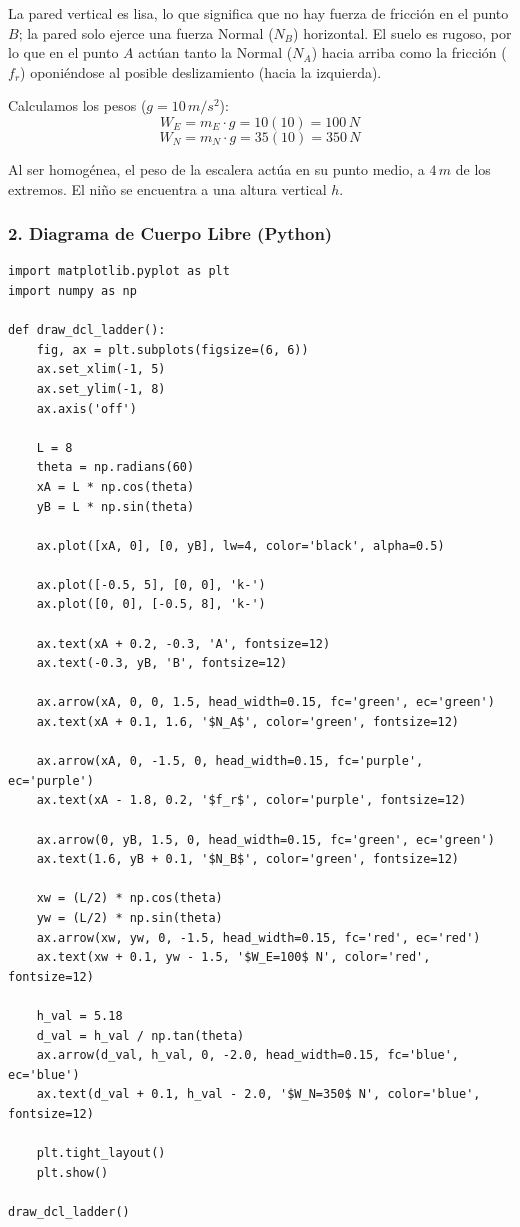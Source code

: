 \documentclass[12pt, a4paper]{article}
\begin{document}
La pared vertical es lisa, lo que significa que no hay fuerza de fricción en el punto $B$; la pared solo ejerce una fuerza Normal ($N_B$) horizontal. El suelo es rugoso, por lo que en el punto $A$ actúan tanto la Normal ($N_A$) hacia arriba como la fricción ($f_r$) oponiéndose al posible deslizamiento (hacia la izquierda).

Calculamos los pesos ($g=10\,\si{m/s^2}$):
$$W_E = m_E \cdot g = 10(10) = 100 \, \si{N}$$
$$W_N = m_N \cdot g = 35(10) = 350 \, \si{N}$$

Al ser homogénea, el peso de la escalera actúa en su punto medio, a $4 \, \si{m}$ de los extremos. El niño se encuentra a una altura vertical $h$.

\subsubsection*{2. Diagrama de Cuerpo Libre (Python)}

\begin{lstlisting}
import matplotlib.pyplot as plt
import numpy as np

def draw_dcl_ladder():
    fig, ax = plt.subplots(figsize=(6, 6))
    ax.set_xlim(-1, 5)
    ax.set_ylim(-1, 8)
    ax.axis('off')

    L = 8
    theta = np.radians(60)
    xA = L * np.cos(theta)
    yB = L * np.sin(theta)

    ax.plot([xA, 0], [0, yB], lw=4, color='black', alpha=0.5)

    ax.plot([-0.5, 5], [0, 0], 'k-')
    ax.plot([0, 0], [-0.5, 8], 'k-')

    ax.text(xA + 0.2, -0.3, 'A', fontsize=12)
    ax.text(-0.3, yB, 'B', fontsize=12)

    ax.arrow(xA, 0, 0, 1.5, head_width=0.15, fc='green', ec='green')
    ax.text(xA + 0.1, 1.6, '$N_A$', color='green', fontsize=12)

    ax.arrow(xA, 0, -1.5, 0, head_width=0.15, fc='purple', ec='purple')
    ax.text(xA - 1.8, 0.2, '$f_r$', color='purple', fontsize=12)

    ax.arrow(0, yB, 1.5, 0, head_width=0.15, fc='green', ec='green')
    ax.text(1.6, yB + 0.1, '$N_B$', color='green', fontsize=12)

    xw = (L/2) * np.cos(theta)
    yw = (L/2) * np.sin(theta)
    ax.arrow(xw, yw, 0, -1.5, head_width=0.15, fc='red', ec='red')
    ax.text(xw + 0.1, yw - 1.5, '$W_E=100$ N', color='red', fontsize=12)

    h_val = 5.18
    d_val = h_val / np.tan(theta)
    ax.arrow(d_val, h_val, 0, -2.0, head_width=0.15, fc='blue', ec='blue')
    ax.text(d_val + 0.1, h_val - 2.0, '$W_N=350$ N', color='blue', fontsize=12)

    plt.tight_layout()
    plt.show()

draw_dcl_ladder()
\end{lstlisting}
\end{document}
